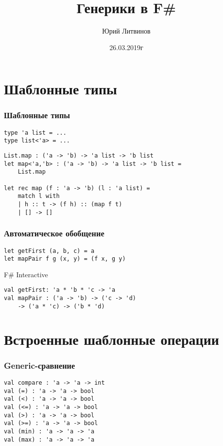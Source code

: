 \documentclass[xetex,mathserif,serif]{beamer}
\title{Генерики в F\#}
\author{Юрий Литвинов}
\date{26.03.2019г}
\begin{document}
	
	\frame{\titlepage}
	
	\section{Шаблонные типы}
	
	\begin{frame}[fragile]
		\frametitle{Шаблонные типы}
		\begin{verbatim}
type 'a list = ...
type list<'a> = ...
		\end{verbatim}

		\begin{verbatim}
List.map : ('a -> 'b) -> 'a list -> 'b list
let map<'a,'b> : ('a -> 'b) -> 'a list -> 'b list = 
    List.map

let rec map (f : 'a -> 'b) (l : 'a list) =
    match l with
    | h :: t -> (f h) :: (map f t)
    | [] -> []
		\end{verbatim}
	\end{frame}

	\begin{frame}[fragile]
		\frametitle{Автоматическое обобщение}
		\begin{verbatim}
let getFirst (a, b, c) = a
let mapPair f g (x, y) = (f x, g y)
		\end{verbatim}

		\begin{alertblock}{F\# Interactive}
			\begin{verbatim}
val getFirst: 'a * 'b * 'c -> 'a
val mapPair : ('a -> 'b) -> ('c -> 'd) 
    -> ('a * 'c) -> ('b * 'd)
			\end{verbatim}
		\end{alertblock}
	\end{frame}
	
	\section{Встроенные шаблонные операции}

	\begin{frame}[fragile]
		\frametitle{Generic-сравнение}
		\begin{verbatim}
val compare : 'a -> 'a -> int
val (=) : 'a -> 'a -> bool
val (<) : 'a -> 'a -> bool
val (<=) : 'a -> 'a -> bool
val (>) : 'a -> 'a -> bool
val (>=) : 'a -> 'a -> bool
val (min) : 'a -> 'a -> 'a
val (max) : 'a -> 'a -> 'a
		\end{verbatim}
	\end{frame}
\end{document}
